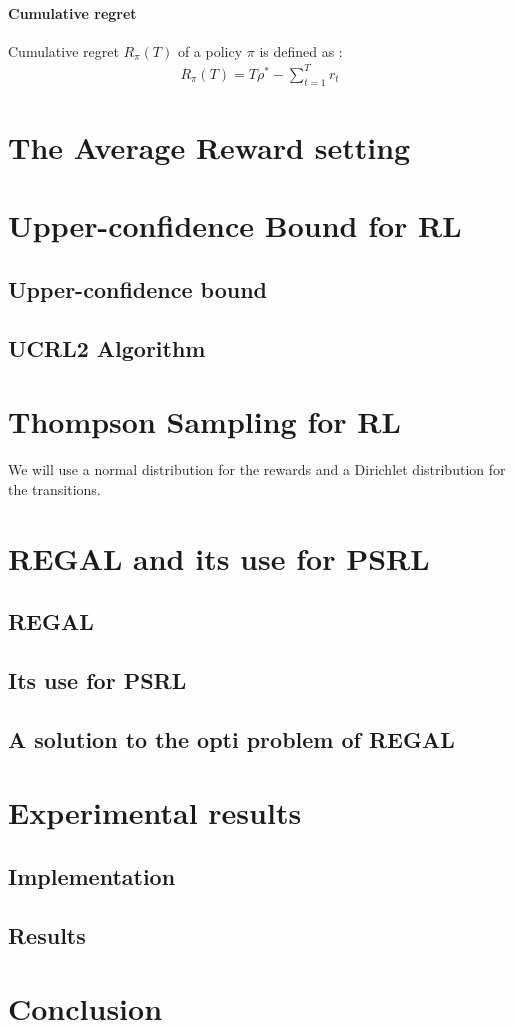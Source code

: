 \documentclass{article}
\begin{document}
\paragraph{Cumulative regret\\}
Cumulative regret $R_{\pi}(T)$ of a policy $\pi$ is defined as :
\begin{align*}
R_{\pi}(T) = T\rho^{*} - \sum\limits_{t = 1}^{T} r_t
\end{align*}

\section{The Average Reward setting}

\section{Upper-confidence Bound for RL}
\cite{bubeck2012regret}
\subsection{Upper-confidence bound}
\subsection{UCRL2 Algorithm}

\section{Thompson Sampling for RL}
We will use a normal distribution for the rewards and a Dirichlet distribution for the transitions.


\section{REGAL and its use for PSRL}
\subsection{REGAL}
\subsection{Its use for PSRL}
\subsection{A solution to the opti problem of REGAL}

\section{Experimental results}
\subsection{Implementation}
\subsection{Results}


\section{Conclusion}


\end{document}
